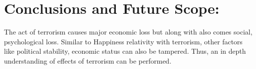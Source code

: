 \documentclass{article}
\begin{document}
\section{Conclusions and Future Scope:}
The act of terrorism causes major economic loss but along with also comes social, psychological loss. Similar to Happiness relativity with terrorism, other factors like political stability, economic status can also be tampered. Thus, an in depth understanding of effects of terrorism can be performed.


{
\small

}


\end{document}
